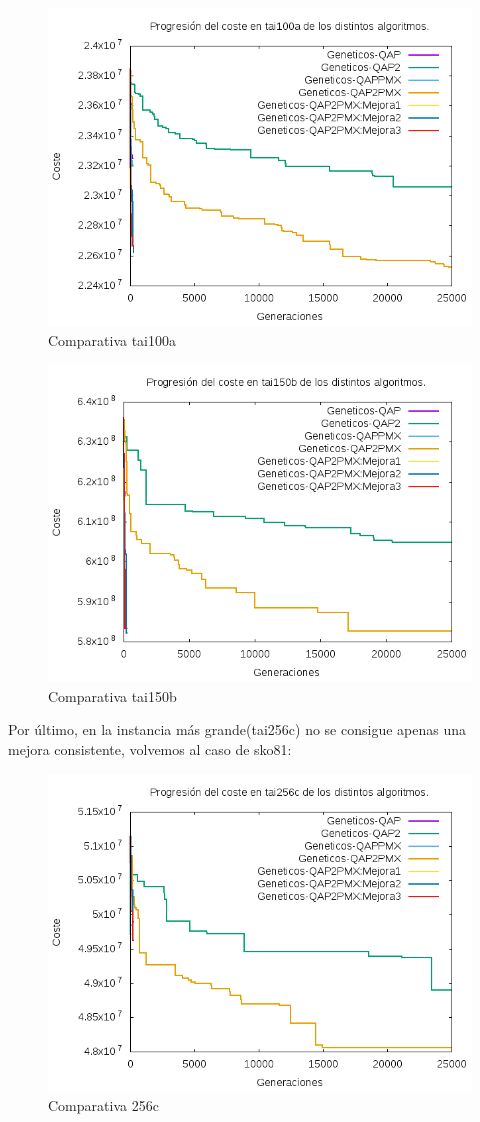 \begin{figure}[H]
	\centering
	\includegraphics[width=0.7\linewidth]{graficos/comparativatai100a}
	\caption[Comparativa tai100a]{Comparativa tai100a}
	\label{fig:comparativatai100a}
\end{figure}

\begin{figure}[H]
	\centering
	\includegraphics[width=0.7\linewidth]{graficos/comparativatai150b}
	\caption[Comparativa tai150b]{Comparativa tai150b}
	\label{fig:comparativatai150b}
\end{figure}

Por último, en la instancia más grande(tai256c) no se consigue apenas una mejora consistente, volvemos al caso de  sko81:\\

\begin{figure}[H]
\centering
\includegraphics[width=0.7\linewidth]{graficos/comparativatai256c}
\caption[]{Comparativa 256c}
\label{fig:comparativatai256c}
\end{figure}

